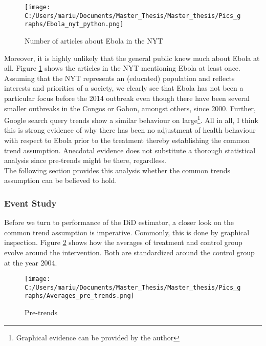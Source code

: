 \documentclass{article}
\begin{document}
\begin{figure}[!ht]
\begin{center}\caption{ Number of articles about Ebola in the NYT \label{Number of articles about Ebola in the NYT}}
\texttt{[image: C:/Users/mariu/Documents/Master\_Thesis/Master\_thesis/Pics\_graphs/Ebola\_nyt\_python.png]}\\
\end{center}
\end{figure}

Moreover, it is highly unlikely that the general public knew much about Ebola at all. Figure \ref{Number of articles about Ebola in the NYT} shows the articles in the NYT mentioning Ebola at least once. Assuming that the NYT represents an (educated) population and reflects interests and priorities of a society, we clearly see that Ebola has not been a particular focus before the 2014 outbreak even though there have been several smaller outbreaks in the Congos or Gabon, amongst others, since 2000. Further, Google search query trends show a similar behaviour on large\footnote{Graphical evidence can be provided by the author}. All in all, I think this is strong evidence of why there has been no adjustment of health behaviour with respect to Ebola prior to the treatment thereby establishing the common trend assumption. Anecdotal evidence does not substitute a thorough statistical analysis since pre-trends might be there, regardless. \\
The following section provides this analysis whether the common trends assumption can be believed to hold.

\subsubsection{Event Study}

Before we turn to performance of the DiD estimator, a closer look on the common trend assumption is imperative. Commonly, this is done by graphical inspection. Figure \ref{Pre-trends} shows how the averages of treatment and control group evolve around the intervention. Both are standardized around the control group at the year 2004.

\begin{figure}[!ht]
\begin{center}\caption{Pre-trends \label{Pre-trends}}
\texttt{[image: C:/Users/mariu/Documents/Master\_Thesis/Master\_thesis/Pics\_graphs/Averages\_pre\_trends.png]}\\
\end{center}
\end{figure}
\end{document}
